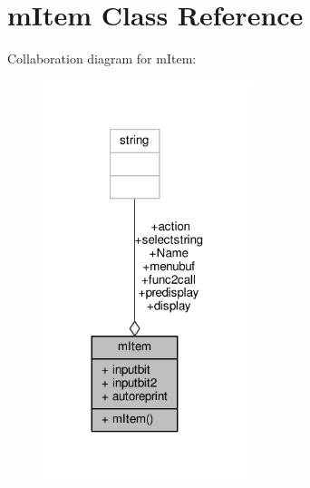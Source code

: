 \hypertarget{classmItem}{}\section{m\+Item Class Reference}
\label{classmItem}


Collaboration diagram for m\+Item\+:
\nopagebreak
\begin{figure}[H]
\begin{center}
\leavevmode
\includegraphics[width=173pt]{d7/d8b/classmItem__coll__graph}
\end{center}
\end{figure}
